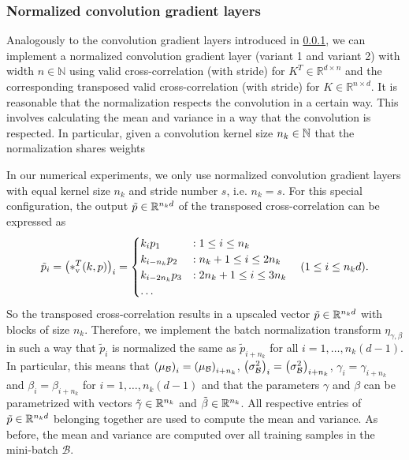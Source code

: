 \documentclass[twoside,a4paper]{article}
\begin{document}
\subsubsection{Normalized convolution gradient layers}\label{sec_conv_gradient_layer}

Analogously to the convolution gradient layers introduced in \cref{sec_conv_gradient_layer},
we can implement a normalized convolution gradient layer (variant 1 and variant 2) 
with width $n \in \mathbb{N}$
using valid cross-correlation (with stride) for $K^T \in \mathbb{R}^{d \times n}$ and the
corresponding transposed valid cross-correlation (with stride) for $K \in \mathbb{R}^{n \times d}$.
It is reasonable that the normalization respects the convolution in a certain way.
This involves calculating the mean and variance in a way that the convolution is respected.
In particular, given a convolution kernel size $n_k \in \mathbb{N}$
that the normalization shares weights 

In our numerical experiments, we only use normalized convolution gradient layers with equal 
kernel size $n_k$ and stride number $s$, i.e. $n_k = s$. For this special configuration,
the output $\tilde{p} \in \mathbb{R}^{n_k d}$ of the transposed cross-correlation can be expressed as
\begin{equation*}
	\tilde{p}_i = \left( *_{\text{v}}^T(k,p) \right)_i = \begin{cases}
		k_i p_1 &: 1 \leq i \leq n_k \\
		k_{i - n_k} p_2 &: n_k+1 \leq i \leq 2n_k \\
		k_{i - 2n_k} p_3 &: 2n_k+1 \leq i \leq 3n_k \\
		\dots
	\end{cases} \quad (1 \leq i \leq n_k d)
	.
\end{equation*}
So the transposed cross-correlation results in a upscaled vector $\tilde{p} \in \mathbb{R}^{n_k d}$ with blocks of size $n_k$.
Therefore, we implement the batch normalization transform $\eta_{\gamma, \beta}$ in such a way that $\tilde{p}_i$ is
normalized the same as $\tilde{p}_{i+n_k}$ for all $i = 1, \dots, n_k (d-1)$. In particular, this means that
$\left( \mu_\mathcal{B} \right)_i = \left( \mu_\mathcal{B} \right)_{i+n_k}$, 
$\left( \sigma^2_\mathcal{B} \right)_i = \left( \sigma^2_\mathcal{B} \right)_{i+n_k}$, 
$\gamma_i = \gamma_{i+n_k}$ and $\beta_i = \beta_{i+n_k}$ for $i = 1, \dots, n_k (d-1)$
and that the parameters $\gamma$ and $\beta$ can be parametrized with vectors
$\tilde{\gamma} \in \mathbb{R}^{n_k}$ and $\tilde{\beta} \in \mathbb{R}^{n_k}$. All respective entries of $\tilde{p} \in \mathbb{R}^{n_k d}$ 
belonging together are used to compute the mean and variance.
As before, the mean and variance are computed over all training samples in the mini-batch $\mathcal{B}$.
\end{document}
